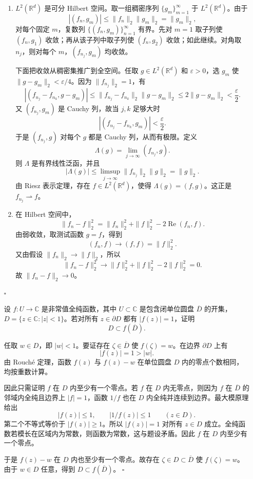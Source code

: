 \documentclass[UTF8,12pt]{ctexart}
\newcommand{\C}{\mathbb C}
\newcommand{\R}{\mathbb R}
\newcounter{problem}
\newenvironment{problem}[1][]{%
  \refstepcounter{problem}
  \par\bigskip
  \noindent{\large\bfseries 题目 \theproblem\if\relax\detokenize{#1}\relax\else\quad #1\fi}\par
  \smallskip
  \noindent\ignorespaces
}{\par}
\newenvironment{solution}{%
  \par\medskip
  \noindent{\bfseries 解答}\quad\ignorespaces
}{\hfill$\square$\par\medskip}
\begin{document}
\begin{solution}
\begin{enumerate}[label=(\arabic*)]
\item \(L^2(\R^d)\) 是可分 Hilbert 空间。取一组稠密序列 \(\{g_m\}_{m=1}^\infty\) 于 \(L^2(\R^d)\)。由于
\[
|(f_n,g_m)|\le \|f_n\|_2\|g_m\|_2=\|g_m\|_2,
\]
对每个固定 \(m\)，复数列 \(\{(f_n,g_m)\}_{n=1}^\infty\) 有界。先对 \(m=1\) 取子列使 \((f_n,g_1)\) 收敛；再从该子列中取子列使 \((f_n,g_2)\) 收敛；如此继续。对角取 \(n_j\)，则对每个 \(m\)，\((f_{n_j},g_m)\) 均收敛。

下面把收敛从稠密集推广到全空间。任取 \(g\in L^2(\R^d)\) 和 \(\varepsilon>0\)，选 \(g_m\) 使 \(\|g-g_m\|_2<\varepsilon/4\)。因为 \(\|f_{n_j}\|_2=1\)，有
\[
|(f_{n_j}-f_{n_k},g-g_m)|\le
\|f_{n_j}-f_{n_k}\|_2\|g-g_m\|_2
\le 2\|g-g_m\|_2<\frac{\varepsilon}{2}.
\]
又 \((f_{n_j},g_m)\) 是 Cauchy 列，故当 \(j,k\) 足够大时
\[
|(f_{n_j}-f_{n_k},g_m)|<\frac{\varepsilon}{2}.
\]
于是 \((f_{n_j},g)\) 对每个 \(g\) 都是 Cauchy 列，从而有极限。定义
\[
\Lambda(g)=\lim_{j\to\infty}(f_{n_j},g).
\]
则 \(\Lambda\) 是有界线性泛函，并且
\[
|\Lambda(g)|\le \limsup_{j\to\infty}\|f_{n_j}\|_2\|g\|_2=\|g\|_2.
\]
由 Riesz 表示定理，存在 \(f\in L^2(\R^d)\)，使得 \(\Lambda(g)=(f,g)\)。这正是 \(f_{n_j}\rightharpoonup f\)。

\item 在 Hilbert 空间中，
\[
\|f_n-f\|_2^2
=\|f_n\|_2^2+\|f\|_2^2-2\operatorname{Re}(f_n,f).
\]
由弱收敛，取测试函数 \(g=f\)，得到
\[
(f_n,f)\to(f,f)=\|f\|_2^2.
\]
又由假设 \(\|f_n\|_2\to\|f\|_2\)，所以
\[
\|f_n-f\|_2^2
\to \|f\|_2^2+\|f\|_2^2-2\|f\|_2^2=0.
\]
故 \(\|f_n-f\|_2\to0\)。
\end{enumerate}
\end{solution}

\begin{problem}
设 \(f:U\to\C\) 是非常值全纯函数，其中 \(U\subset\C\) 是包含闭单位圆盘 \(\overline D\) 的开集，\(D=\{z\in\C:|z|<1\}\)。若对所有 \(z\in\partial D\) 都有 \(|f(z)|=1\)，证明
\[
D\subset f(\overline D).
\]
\end{problem}

\begin{solution}
任取 \(w\in D\)，即 \(|w|<1\)。要证存在 \(\zeta\in\overline D\) 使 \(f(\zeta)=w\)。在边界 \(\partial D\) 上有
\[
|f(z)|=1>|w|.
\]
由 Rouché 定理，函数 \(f(z)\) 与 \(f(z)-w\) 在单位圆盘 \(D\) 内的零点个数相同，均按重数计算。

因此只需证明 \(f\) 在 \(D\) 内至少有一个零点。若 \(f\) 在 \(D\) 内无零点，则因为 \(f\) 在 \(\overline D\) 的邻域内全纯且边界上 \(|f|=1\)，函数 \(1/f\) 也在 \(D\) 内全纯并连续到边界。最大模原理给出
\[
|f(z)|\le1,\qquad |1/f(z)|\le1\qquad(z\in D).
\]
第二个不等式等价于 \(|f(z)|\ge1\)。所以 \(|f(z)|=1\) 对所有 \(z\in D\) 成立。全纯函数若模长在区域内为常数，则函数为常数，这与题设矛盾。因此 \(f\) 在 \(D\) 内至少有一个零点。

于是 \(f(z)-w\) 在 \(D\) 内也至少有一个零点。故存在 \(\zeta\in D\subset\overline D\) 使 \(f(\zeta)=w\)。由于 \(w\in D\) 任意，得到 \(D\subset f(\overline D)\)。
\end{solution}
\end{document}
